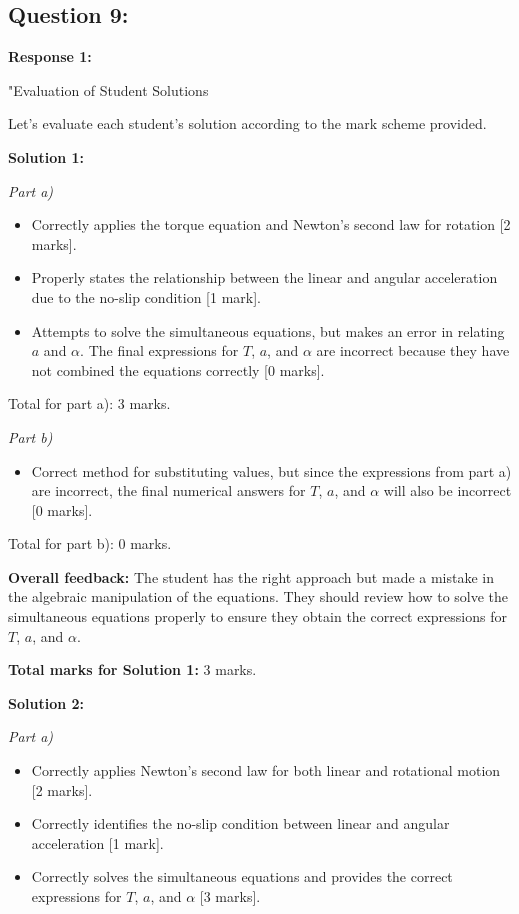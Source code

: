 \documentclass[a4paper,11pt]{article}
\begin{document}
\subsection*{Question 9:}

\textbf{Response 1:}

"Evaluation of Student Solutions

Let's evaluate each student's solution according to the mark scheme provided.

\textbf{Solution 1:}

\textit{Part a)}
\begin{itemize}
    \item Correctly applies the torque equation and Newton's second law for rotation [2 marks].
    \item Properly states the relationship between the linear and angular acceleration due to the no-slip condition [1 mark].
    \item Attempts to solve the simultaneous equations, but makes an error in relating \( a \) and \( \alpha \). The final expressions for \( T \), \( a \), and \( \alpha \) are incorrect because they have not combined the equations correctly [0 marks].
\end{itemize}

Total for part a): 3 marks.

\textit{Part b)}
\begin{itemize}
    \item Correct method for substituting values, but since the expressions from part a) are incorrect, the final numerical answers for \( T \), \( a \), and \( \alpha \) will also be incorrect [0 marks].
\end{itemize}

Total for part b): 0 marks.

\textbf{Overall feedback:} The student has the right approach but made a mistake in the algebraic manipulation of the equations. They should review how to solve the simultaneous equations properly to ensure they obtain the correct expressions for \( T \), \( a \), and \( \alpha \).

\textbf{Total marks for Solution 1:} 3 marks.

\textbf{Solution 2:}

\textit{Part a)}
\begin{itemize}
    \item Correctly applies Newton's second law for both linear and rotational motion [2 marks].
    \item Correctly identifies the no-slip condition between linear and angular acceleration [1 mark].
    \item Correctly solves the simultaneous equations and provides the correct expressions for \( T \), \( a \), and \( \alpha \) [3 marks].
\end{itemize}
\end{document}
